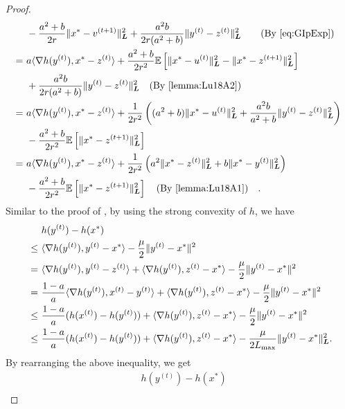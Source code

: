 \begin{proof}
\begin{equation}
\begin{split}
    &- \frac{a^2+b}{2r} \| x^* - v^{(t+1)} \|_{\bL}^2 + \frac{a^2b}{2r(a^2+b)} \| y^{(t)} - z^{(t)} \|_{\bL}^2 \quad \text{(By \eqref{eq:GIpExp})} \\
    {=}~& a \langle \nabla h( y^{(t)} ), x^* - z^{(t)} \rangle + \frac{a^2+b}{2r^2} \mE \left[ \| x^* - u^{(t)} \|_{\bL}^2 - \| x^* - z^{(t+1)} \|_{\bL}^2 \right] \\
    &+ \frac{a^2b}{2r(a^2+b)} \| y^{(t)} - z^{(t)} \|_{\bL}^2 \text{(By \autoref{lemma:Lu18A2})} \\
    =~& a \langle \nabla h( y^{(t)} ), x^* - z^{(t)} \rangle + \frac{1}{2r^2} \left( (a^2 +b ) \| x^* - u^{(t)} \|_{\bL}^2 + \frac{a^2b}{a^2+b}  \| y^{(t)} - z^{(t)} \|_{\bL}^2 \right) \\
    &- \frac{a^2 + b}{2r^2} \mE \left[  \| x^* - z^{(t+1)} \|_{\bL}^2 \right] \\
    =~& a \langle \nabla h( y^{(t)} ), x^* - z^{(t)} \rangle + \frac{1}{2r^2} \left( a^2 \| x^* - z^{(t)} \|_{\bL}^2 + b \| x^* - y^{(t)} \|_{\bL}^2 \right) \\
    &- \frac{a^2 + b}{2r^2} \mE \left[  \| x^* - z^{(t+1)} \|_{\bL}^2 \right] \text{(By \autoref{lemma:Lu18A1})}. 
\end{split}
\end{equation}
Similar to the proof of \citet[Theorem~3.1]{Lu18}, by using the strong convexity of $h$, we have
\begin{align*}
    &h( y^{(t)} ) - h(x^*) \\
    ~\leq~& \langle \nabla h( y^{(t)} ), y^{(t)} - x^*  \rangle - \frac{\mu}{2} \| y^{(t)} - x^* \|^2 \\
    ~=~& \langle \nabla h( y^{(t)} ), y^{(t)} - z^{(t)} \rangle + \langle \nabla h( y^{(t)} ), z^{(t)} - x^* \rangle - \frac{\mu}{2} \| y^{(t)} - x^* \|^2 \\
    ~=~&  \frac{1-a}{a}\langle \nabla h( y^{(t)} ), x^{(t)} - y^{(t)} \rangle + \langle \nabla h( y^{(t)} ), z^{(t)} - x^* \rangle - \frac{\mu}{2} \| y^{(t)} - x^* \|^2 \\
    ~\leq~ & \frac{1-a}{a}( h( x^{(t)} ) - h(y^{(t)}) ) + \langle \nabla h( y^{(t)} ), z^{(t)} - x^* \rangle - \frac{\mu}{2} \| y^{(t)} - x^* \|^2  \\
    ~\leq~ & \frac{1-a}{a}( h( x^{(t)} ) - h(y^{(t)}) ) + \langle \nabla h( y^{(t)} ), z^{(t)} - x^* \rangle - \frac{\mu}{2L_{\max}} \| y^{(t)} - x^* \|^2_{\boldsymbol{L}}.
\end{align*}
By rearranging the above inequality, we get
\begin{align*}
    &h( y^{(t)} ) - h(x^*)\\ 

\end{align*}
\end{proof}
